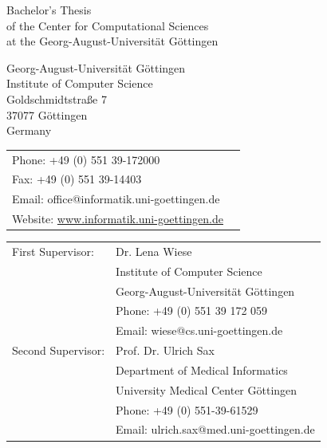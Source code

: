 \begin{titlepage}
    Bachelor's Thesis\\
    of the Center for Computational Sciences\\
    at the Georg-August-Universität Göttingen

    \vfill
    \mysubmissiondate


    \newpage
    \clearpage
    \thispagestyle{empty}
    \flushleft
    \normalsize
    \onehalfspacing
    
    \vspace{12cm}

    Georg-August-Universität Göttingen\\
    Institute of Computer Science\\[3ex]
    Goldschmidtstraße 7\\
    37077 Göttingen\\
    Germany\\[3ex]

    \begin{tabular}{@{}ll}
        Phone: +49 (0) 551 39-172000\\
        Fax: +49 (0) 551 39-14403\\
        Email: office@informatik.uni-goettingen.de\\
        Website: \url{www.informatik.uni-goettingen.de}\\
    \end{tabular}

    \vspace{2.0cm}

    \begin{tabular}{@{}ll}
        First Supervisor: & Dr. Lena Wiese\\
        & Institute of Computer Science\\
        & Georg-August-Universität Göttingen\\
        & Phone: +49 (0) 551 39 172 059\\
        & Email: wiese@cs.uni-goettingen.de\\
        Second Supervisor:& Prof. Dr. Ulrich Sax\\
        & Department of Medical Informatics\\
        & University Medical Center Göttingen\\
        & Phone: +49 (0) 551-39-61529\\
        & Email: ulrich.sax@med.uni-goettingen.de\\
    \end{tabular}

    \clearpage
\end{titlepage}